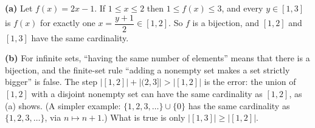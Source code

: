 \textbf{(a)} Let $f(x)=2x-1$. If $1\le x\le2$ then $1\le f(x)\le3$, and every $y\in[1,3]$ is $f(x)$ for exactly one $x=\dfrac{y+1}{2}\in[1,2]$. So $f$ is a bijection, and $[1,2]$ and $[1,3]$ have the same cardinality.

\textbf{(b)} For infinite sets, ``having the same number of elements'' means that there is a bijection, and the finite-set rule ``adding a nonempty set makes a set strictly bigger'' is false. The step $|[1,2]|+|(2,3]|>|[1,2]|$ is the error: the union of $[1,2]$ with a disjoint nonempty set can have the same cardinality as $[1,2]$, as (a) shows. (A simpler example: $\{1,2,3,\ldots\}\cup\{0\}$ has the same cardinality as $\{1,2,3,\ldots\}$, via $n\mapsto n+1$.) What is true is only $|[1,3]|\ge|[1,2]|$.
